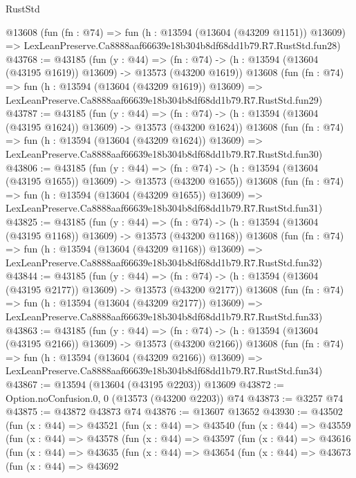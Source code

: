 \begin{lexlean}{RustStd}
\begin{coremodule}
    @13608
    (fun (fn : @74) =>
    fun (h : @13594 (@13604 (@43209 @1151)) @13609) =>
    LexLeanPreserve.Ca8888aaf66639e18b304b8df68dd1b79.R7.RustStd.fun28)
@43768 := @43185
    (fun (y : @44) =>
    (fn : @74) -> (h : @13594 (@13604 (@43195 @1619)) @13609) -> @13573 (@43200 @1619))
    @13608
    (fun (fn : @74) =>
    fun (h : @13594 (@13604 (@43209 @1619)) @13609) =>
    LexLeanPreserve.Ca8888aaf66639e18b304b8df68dd1b79.R7.RustStd.fun29)
@43787 := @43185
    (fun (y : @44) =>
    (fn : @74) -> (h : @13594 (@13604 (@43195 @1624)) @13609) -> @13573 (@43200 @1624))
    @13608
    (fun (fn : @74) =>
    fun (h : @13594 (@13604 (@43209 @1624)) @13609) =>
    LexLeanPreserve.Ca8888aaf66639e18b304b8df68dd1b79.R7.RustStd.fun30)
@43806 := @43185
    (fun (y : @44) =>
    (fn : @74) -> (h : @13594 (@13604 (@43195 @1655)) @13609) -> @13573 (@43200 @1655))
    @13608
    (fun (fn : @74) =>
    fun (h : @13594 (@13604 (@43209 @1655)) @13609) =>
    LexLeanPreserve.Ca8888aaf66639e18b304b8df68dd1b79.R7.RustStd.fun31)
@43825 := @43185
    (fun (y : @44) =>
    (fn : @74) -> (h : @13594 (@13604 (@43195 @1168)) @13609) -> @13573 (@43200 @1168))
    @13608
    (fun (fn : @74) =>
    fun (h : @13594 (@13604 (@43209 @1168)) @13609) =>
    LexLeanPreserve.Ca8888aaf66639e18b304b8df68dd1b79.R7.RustStd.fun32)
@43844 := @43185
    (fun (y : @44) =>
    (fn : @74) -> (h : @13594 (@13604 (@43195 @2177)) @13609) -> @13573 (@43200 @2177))
    @13608
    (fun (fn : @74) =>
    fun (h : @13594 (@13604 (@43209 @2177)) @13609) =>
    LexLeanPreserve.Ca8888aaf66639e18b304b8df68dd1b79.R7.RustStd.fun33)
@43863 := @43185
    (fun (y : @44) =>
    (fn : @74) -> (h : @13594 (@13604 (@43195 @2166)) @13609) -> @13573 (@43200 @2166))
    @13608
    (fun (fn : @74) =>
    fun (h : @13594 (@13604 (@43209 @2166)) @13609) =>
    LexLeanPreserve.Ca8888aaf66639e18b304b8df68dd1b79.R7.RustStd.fun34)
@43867 := @13594 (@13604 (@43195 @2203)) @13609
@43872 := Option.noConfusion.{0, 0} (@13573 (@43200 @2203)) @74
@43873 := @3257 @74
@43875 := @43872 @43873 @74
@43876 := @13607 @13652
@43930 := @43502
    (fun (x : @44) =>
    @43521
      (fun (x : @44) =>
      @43540
        (fun (x : @44) =>
        @43559
          (fun (x : @44) =>
          @43578
            (fun (x : @44) =>
            @43597
              (fun (x : @44) =>
              @43616
                (fun (x : @44) =>
                @43635
                  (fun (x : @44) =>
                  @43654
                    (fun (x : @44) =>
                    @43673
                      (fun (x : @44) =>
                      @43692

\end{coremodule}
\end{lexlean}
